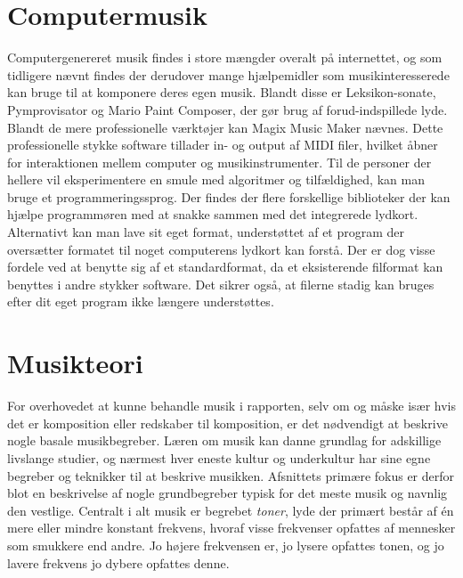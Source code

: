 \section {Computermusik}
Computergenereret musik findes i store mængder overalt på internettet, og som tidligere nævnt findes der derudover mange hjælpemidler som musikinteresserede kan bruge til at komponere deres egen musik. Blandt disse er  Leksikon-sonate, Pymprovisator og  Mario Paint Composer, der gør brug af forud-indspillede lyde. Blandt de mere professionelle værktøjer kan  Magix Music Maker nævnes. Dette professionelle stykke software tillader in- og output af MIDI filer, hvilket åbner for interaktionen mellem computer og musikinstrumenter. \todocite{}
Til de personer der hellere vil eksperimentere en smule med algoritmer og tilfældighed, kan man bruge et programmeringssprog. Der findes der flere forskellige biblioteker der kan hjælpe programmøren med at snakke sammen med det integrerede lydkort. 
Alternativt kan man lave sit eget format, understøttet af et  program der oversætter formatet til noget computerens lydkort kan forstå. Der er dog visse fordele ved at benytte sig af et standardformat, da et eksisterende filformat kan benyttes i andre stykker software. Det sikrer også, at filerne stadig kan bruges efter dit eget program ikke længere understøttes.
\section {Musikteori}
For overhovedet at kunne behandle musik i rapporten, selv om og måske især hvis det er komposition eller redskaber til komposition, er det nødvendigt at beskrive nogle basale musikbegreber. Læren om musik kan danne grundlag for adskillige livslange studier, og nærmest hver eneste kultur og underkultur har sine egne begreber og teknikker til at beskrive musikken. 
Afsnittets primære fokus er derfor blot en beskrivelse af nogle grundbegreber typisk for det meste musik og navnlig den vestlige. 
Centralt i alt musik er begrebet  \textit{toner}, lyde der primært består af én mere eller mindre konstant frekvens, hvoraf visse frekvenser opfattes af mennesker som smukkere end andre.
Jo højere frekvensen er, jo lysere opfattes tonen, og jo lavere frekvens jo dybere opfattes denne. \cite{msparkMusic}
